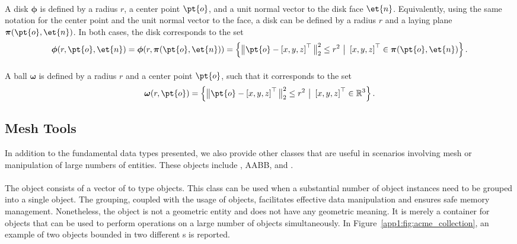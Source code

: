 \paragraph{\Disk{}}
A disk $\boldsymbol{\phi}$ is defined by a radius $r$, a center point $\pt{o}$, and a unit normal vector to the disk face $\et{n}$. Equivalently, using the same notation for the center point and the unit normal vector to the face, a disk can be defined by a radius $r$ and a laying plane $\boldsymbol{\pi}(\pt{o}, \et{n})$. In both cases, the disk corresponds to the set
%
\begin{equation*}
  \boldsymbol{\phi}(r, \pt{o}, \et{n}) = \boldsymbol{\phi}(r, \boldsymbol{\pi}(\pt{o}, \et{n})) = \left\{ \big\| \pt{o} - \left[x, y, z\right]^{\top} \big\|^2_2 \le r^2 ~ \big| ~ \left[x, y, z\right]^{\top} \in \boldsymbol{\pi}(\pt{o}, \et{n}) \right\} \text{.}
\end{equation*}

\paragraph{\Ball{}}
A ball $\boldsymbol{\omega}$ is defined by a radius $r$ and a center point $\pt{o}$, such that it corresponds to the set
%
\begin{equation*}
  \boldsymbol{\omega}(r, \pt{o}) = \left\{ \big\| \pt{o} - \left[x, y, z\right]^{\top} \big\|^2_2 \le r^2 ~ \big| ~\left[x, y, z\right]^{\top} \in \mathbb{R}^3 \right\} \text{.}
\end{equation*}

\subsection{Mesh Tools}
In addition to the fundamental data types presented, we also provide other classes that are useful in scenarios involving mesh or manipulation of large numbers of entities. These objects include \Collection{}, \ac{AABB}, and \AabbTree{}.

\paragraph{\Collection{}}
The \Collection{} object consists of a vector of \SharedPointer{} to \Entity{} type objects. This class can be used when a substantial number of \Entity{} object instances need to be grouped into a single object. The grouping, coupled with the usage of \SharedPointer{} objects, facilitates effective data manipulation and ensures safe memory management. Nonetheless, the \Collection{} object is not a geometric entity and does not have any geometric meaning. It is merely a container for \Entity{} objects that can be used to perform operations on a large number of \Entity{} objects simultaneously. In Figure~\ref{app1:fig:acme_collection}, an example of two \Collection{} objects bounded in two different \Aabb{}s is reported.

